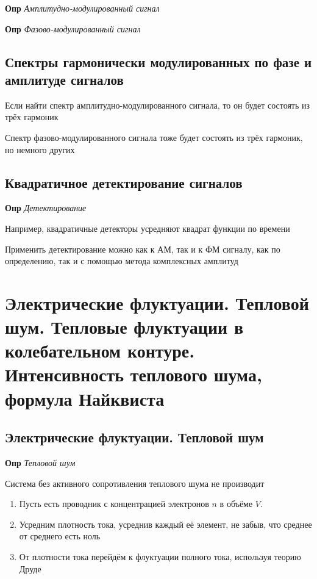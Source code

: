 \documentclass[a4paper, 14pt]{article}
\begin{document}
    \textbf{Опр} \textit{Амплитудно-модулированный сигнал}
    
    \textbf{Опр} \textit{Фазово-модулированный сигнал}
    
    \subsection{Спектры гармонически модулированных по фазе и амплитуде сигналов}
    
    Если найти спектр амплитудно-модулированного сигнала, то он будет состоять из трёх гармоник
    
    Спектр фазово-модулированного сигнала тоже будет состоять из трёх гармоник, но немного других
    
    \subsection{Квадратичное детектирование сигналов}
    
    \textbf{Опр} \textit{Детектирование}
    
    Например, квадратичные детекторы усредняют квадрат функции по времени
    
    Применить детектирование можно как к АМ, так и к ФМ сигналу, как по определению, так и с помощью метода
    комплексных амплитуд
    
    \section{Электрические флуктуации.
    Тепловой шум.
    Тепловые флуктуации в колебательном контуре.
    Интенсивность теплового шума, формула Найквиста}
    
    \subsection{Электрические флуктуации. Тепловой шум}
    
    \textbf{Опр} \textit{Тепловой шум}
    
    Система без активного сопротивления теплового шума не производит
    
    \begin{enumerate}
        \item Пусть есть проводник с концентрацией электронов $n$ в объёме $V$.
        \item Усредним плотность тока, усреднив каждый её элемент, не забыв, что среднее от среднего есть ноль
        \item От плотности тока перейдём к флуктуации полного тока, используя теорию Друде
    \end{enumerate}
    
\end{document}
